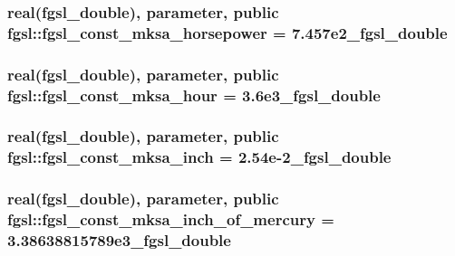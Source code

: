 \subsubsection[{fgsl\+\_\+const\+\_\+mksa\+\_\+horsepower}]{\setlength{\rightskip}{0pt plus 5cm}real({\bf fgsl\+\_\+double}), parameter, public fgsl\+::fgsl\+\_\+const\+\_\+mksa\+\_\+horsepower = 7.\+457e2\+\_\+fgsl\+\_\+double}\label{namespacefgsl_af97c5cddea274909ba83c36dc36e90a3}
\hypertarget{namespacefgsl_aa7d132341cda0d591f1452a894cf5855}{}
\subsubsection[{fgsl\+\_\+const\+\_\+mksa\+\_\+hour}]{\setlength{\rightskip}{0pt plus 5cm}real({\bf fgsl\+\_\+double}), parameter, public fgsl\+::fgsl\+\_\+const\+\_\+mksa\+\_\+hour = 3.\+6e3\+\_\+fgsl\+\_\+double}\label{namespacefgsl_aa7d132341cda0d591f1452a894cf5855}
\hypertarget{namespacefgsl_a272689a26b0b7b5cd89f28713aa251d4}{}
\subsubsection[{fgsl\+\_\+const\+\_\+mksa\+\_\+inch}]{\setlength{\rightskip}{0pt plus 5cm}real({\bf fgsl\+\_\+double}), parameter, public fgsl\+::fgsl\+\_\+const\+\_\+mksa\+\_\+inch = 2.\+54e-\/2\+\_\+fgsl\+\_\+double}\label{namespacefgsl_a272689a26b0b7b5cd89f28713aa251d4}
\hypertarget{namespacefgsl_a66f697c831591659ce7e9305e7c18c46}{}
\subsubsection[{fgsl\+\_\+const\+\_\+mksa\+\_\+inch\+\_\+of\+\_\+mercury}]{\setlength{\rightskip}{0pt plus 5cm}real({\bf fgsl\+\_\+double}), parameter, public fgsl\+::fgsl\+\_\+const\+\_\+mksa\+\_\+inch\+\_\+of\+\_\+mercury = 3.\+38638815789e3\+\_\+fgsl\+\_\+double}\label{namespacefgsl_a66f697c831591659ce7e9305e7c18c46}
\hypertarget{namespacefgsl_afdebd41de62af9d5a4b9ed6efcf9cea2}{}
